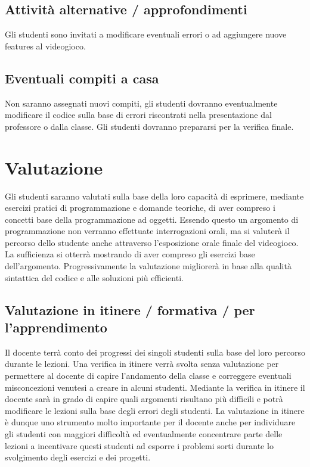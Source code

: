 \documentclass[12pt,a4paper]{article}
\begin{document}
\subsection*{Attività alternative / approfondimenti}
Gli studenti sono invitati a modificare eventuali errori o ad aggiungere nuove features al videogioco.

\subsection*{Eventuali compiti a casa}
Non saranno assegnati nuovi compiti, gli studenti dovranno eventualmente modificare il codice sulla base di errori riscontrati nella presentazione dal professore o dalla classe. Gli studenti dovranno prepararsi per la verifica finale.










\section{Valutazione}\label{valutazione}

Gli studenti saranno valutati sulla base della loro capacità di esprimere, mediante esercizi pratici di programmazione e domande teoriche, di aver compreso i concetti base della programmazione ad oggetti. Essendo questo un argomento di programmazione non verranno effettuate interrogazioni orali, ma si valuterà il percorso dello studente anche attraverso l’esposizione orale finale del videogioco. La sufficienza si otterrà mostrando di aver compreso gli esercizi base dell’argomento. Progressivamente la valutazione migliorerà in base alla qualità sintattica del codice e alle soluzioni più efficienti.


\subsection{Valutazione in itinere /
formativa / per l'apprendimento}\label{valutazione-in-itinere-formativa}

Il docente terrà conto dei progressi dei singoli studenti sulla base del loro percorso durante le lezioni. Una verifica in itinere verrà svolta senza valutazione per permettere al docente di capire l’andamento della classe e correggere eventuali misconcezioni venutesi a creare in alcuni studenti. Mediante la verifica in itinere il docente sarà in grado di capire quali argomenti risultano più difficili e potrà modificare le lezioni sulla base degli errori degli studenti. La valutazione in itinere è dunque uno strumento molto importante per il docente anche per individuare gli studenti con maggiori difficoltà ed eventualmente concentrare parte delle lezioni a incentivare questi studenti ad esporre i problemi sorti durante lo svolgimento degli esercizi e dei progetti. 
\end{document}
